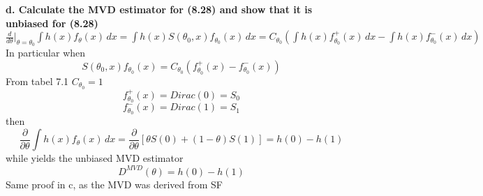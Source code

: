 \documentclass{article}
\begin{document}
\textbf{d. Calculate the MVD estimator for (8.28) and show that it is unbiased for (8.28)} \\
$ \frac{d}{d\theta}|_{\theta=\theta_0}{\textstyle \int h(x)f_\theta(x)\,dx} = {\textstyle \int h(x)S(\theta_0,x)f_{\theta_0}(x)\,dx}=C_{\theta_0}({\textstyle \int h(x)f_{\theta_0}^+(x)\,dx}-{\textstyle \int h(x)f_{\theta_0}^-(x)\,dx}) $  \\
In particular when $$ S(\theta_0,x)f_{\theta_0}(x)=C_{\theta_0}(f_{\theta_0}^+(x)-f_{\theta_0}^-(x)) $$
From tabel 7.1 $C_{\theta_0} = 1$  \\
$$ f_{\theta_0}^+(x) = Dirac(0) = S_0 $$
$$ f_{\theta_0}^-(x) = Dirac(1) = S_1 $$
then $$ \frac{\partial}{\partial\theta}{\textstyle \int h(x)f_\theta(x)\,dx} = \frac{\partial}{\partial\theta}[\theta S(0)+(1-\theta)S(1)] = h(0)-h(1)  $$
while yields the unbiased MVD estimator $$ D^{MVD}(\theta) = h(0)-h(1) $$
Same proof in c, as the MVD was derived from SF
\end{document}
